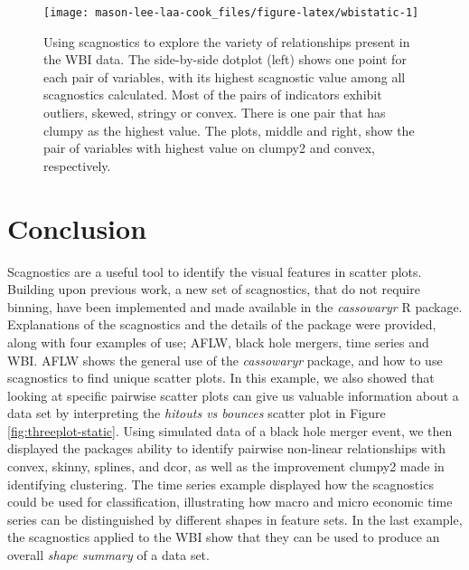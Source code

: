 \begin{figure}
\texttt{[image: mason-lee-laa-cook\_files/figure-latex/wbistatic-1]} \caption{Using scagnostics to explore the variety of relationships present in the WBI data. The side-by-side dotplot (left) shows one point for each pair of variables, with its highest scagnostic value among all scagnostics calculated. Most of the pairs of indicators exhibit outliers, skewed, stringy or convex. There is one pair that has clumpy as the highest value. The plots, middle and right, show the pair of variables with highest value on clumpy2 and convex, respectively.}\label{fig:wbistatic}
\end{figure}

\section{Conclusion}\label{conclusion}

Scagnostics are a useful tool to identify the visual features in scatter plots. Building upon previous work, a new set of scagnostics, that do not require binning, have been implemented and made available in the \emph{cassowaryr} R package. Explanations of the scagnostics and the details of the package were provided, along with four examples of use; AFLW, black hole mergers, time series and WBI. AFLW shows the general use of the \emph{cassowaryr} package, and how to use scagnostics to find unique scatter plots. In this example, we also showed that looking at specific pairwise scatter plots can give us valuable information about a data set by interpreting the \emph{hitouts vs bounces} scatter plot in Figure \ref{fig:threeplot-static}. Using simulated data of a black hole merger event, we then displayed the packages ability to identify pairwise non-linear relationships with convex, skinny, splines, and dcor, as well as the improvement clumpy2 made in identifying clustering. The time series example displayed how the scagnostics could be used for classification, illustrating how macro and micro economic time series can be distinguished by different shapes in feature sets. In the last example, the scagnostics applied to the WBI show that they can be used to produce an overall \emph{shape summary} of a data set.

